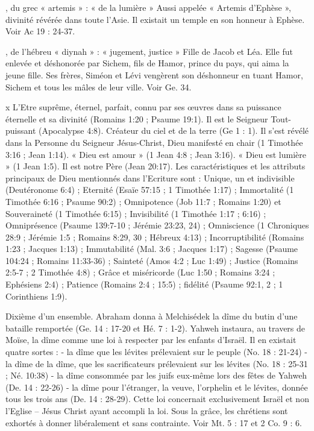 \begin{multicols}{2}
, du grec « artemis » : « de la lumière »
Aussi appelée « Artemis d’Ephèse », divinité révérée dans toute l’Asie. Il existait un temple en son honneur à Ephèse. Voir Ac 19 : 24-37.

, de l'hébreu « diynah » : « jugement, justice »
Fille de Jacob et Léa. Elle fut enlevée et déshonorée par Sichem, fils de Hamor, prince du pays, qui aima la jeune fille. Ses frères, Siméon et Lévi vengèrent son déshonneur en tuant Hamor, Sichem et tous les mâles de leur ville. Voir Ge. 34.

x
L'Etre suprême, éternel, parfait, connu par ses œuvres dans sa puissance éternelle et sa divinité (Romains 1:20 ; Psaume 19:1). Il est le Seigneur Tout-puissant (Apocalypse 4:8). Créateur du ciel et de la terre (Ge 1 : 1). Il s'est révélé dans la Personne du Seigneur Jésus-Christ, Dieu manifesté en chair (1 Timothée 3:16 ; Jean 1:14). « Dieu est amour » (1 Jean 4:8 ; Jean 3:16). « Dieu est lumière » (1 Jean 1:5). Il est notre Père (Jean 20:17). Les caractéristiques et les attributs principaux de Dieu mentionnés dans l'Ecriture sont : Unique, un et indivisible (Deutéronome 6:4) ; Eternité (Esaïe 57:15 ; 1 Timothée 1:17) ; Immortalité (1 Timothée 6:16 ; Psaume 90:2) ; Omnipotence (Job 11:7 ; Romains 1:20) et Souveraineté (1 Timothée 6:15) ; Invisibilité (1 Timothée 1:17 ; 6:16) ; Omniprésence (Psaume 139:7-10 ; Jérémie 23:23, 24) ; Omniscience (1 Chroniques 28:9 ; Jérémie 1:5 ; Romains 8:29, 30 ; Hébreux 4:13) ; Incorruptibilité (Romains 1:23 ; Jacques 1:13) ; Immutabilité (Mal. 3:6 ; Jacques 1:17) ; Sagesse (Psaume 104:24 ; Romains 11:33-36) ; Sainteté (Amos 4:2 ; Luc 1:49) ; Justice (Romains 2:5-7 ; 2 Timothée 4:8) ; Grâce et miséricorde (Luc 1:50 ; Romains 3:24 ; Ephésiens 2:4) ; Patience (Romains 2:4 ; 15:5) ; fidélité (Psaume 92:1, 2 ; 1 Corinthiens 1:9).

Dixième d’un ensemble. Abraham donna à Melchisédek la dîme du butin d'une bataille remportée (Ge. 14 : 17-20 et Hé. 7 : 1-2). Yahweh instaura, au travers de Moïse, la dîme comme une loi à respecter par les enfants d’Israël. Il en existait quatre sortes :
- la dîme que les lévites prélevaient sur le peuple (No. 18 : 21-24)
- la dîme de la dîme, que les sacrificateurs prélevaient sur les lévites (No. 18 : 25-31 ; Né. 10:38)
- la dîme consommée par les juifs eux-même lors des fêtes de Yahweh (De. 14 : 22-26)
- la dîme pour l’étranger, la veuve, l’orphelin et le lévites, donnée tous les trois ans (De. 14 : 28-29).
Cette loi concernait exclusivement Israël et non l’Eglise – Jésus Christ ayant accompli la loi. Sous la grâce, les chrétiens sont exhortés à donner libéralement et sans contrainte. Voir Mt. 5 : 17 et 2 Co. 9 : 6.


\end{multicols}
